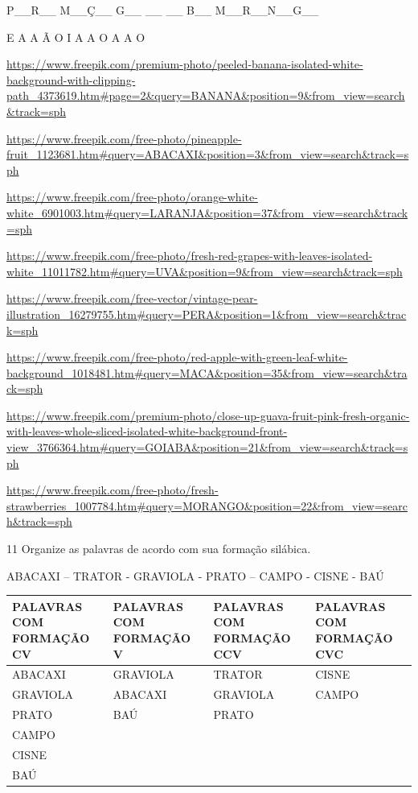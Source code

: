 {{P\_\_R\_\_ M\_\_Ç\_\_ G\_\_ \_\_ \_\_ B\_\_ M\_\_R\_\_N\_\_G\_\_

E A A Ã O I A A O A A O

\url{https://www.freepik.com/premium-photo/peeled-banana-isolated-white-background-with-clipping-path_4373619.htm\#page=2\&query=BANANA\&position=9\&from_view=search\&track=sph}

\url{https://www.freepik.com/free-photo/pineapple-fruit_1123681.htm\#query=ABACAXI\&position=3\&from_view=search\&track=sph}

\url{https://www.freepik.com/free-photo/orange-white-white_6901003.htm\#query=LARANJA\&position=37\&from_view=search\&track=sph}

\url{https://www.freepik.com/free-photo/fresh-red-grapes-with-leaves-isolated-white_11011782.htm\#query=UVA\&position=9\&from_view=search\&track=sph}

\url{https://www.freepik.com/free-vector/vintage-pear-illustration_16279755.htm\#query=PERA\&position=1\&from_view=search\&track=sph}

\url{https://www.freepik.com/free-photo/red-apple-with-green-leaf-white-background_1018481.htm\#query=MACA\&position=35\&from_view=search\&track=sph}

\url{https://www.freepik.com/premium-photo/close-up-guava-fruit-pink-fresh-organic-with-leaves-whole-sliced-isolated-white-background-front-view_3766364.htm\#query=GOIABA\&position=21\&from_view=search\&track=sph}

\url{https://www.freepik.com/free-photo/fresh-strawberries_1007784.htm\#query=MORANGO\&position=22\&from_view=search\&track=sph}

\num{11} Organize as palavras de acordo com sua formação silábica.


ABACAXI -- TRATOR - GRAVIOLA - PRATO -- CAMPO - CISNE - BAÚ

\begin{longtable}[]{@{}llll@{}}
\toprule
\textbf{PALAVRAS COM FORMAÇÃO CV} & \textbf{PALAVRAS COM FORMAÇÃO V} &
\textbf{PALAVRAS COM FORMAÇÃO CCV} & \textbf{PALAVRAS COM FORMAÇÃO
CVC}\tabularnewline
\midrule
\endhead
ABACAXI & GRAVIOLA & TRATOR & CISNE\tabularnewline
GRAVIOLA & ABACAXI & GRAVIOLA & CAMPO\tabularnewline
PRATO & BAÚ & PRATO &\tabularnewline
CAMPO & & &\tabularnewline
CISNE & & &\tabularnewline
BAÚ & & &\tabularnewline
\bottomrule
\end{longtable}

}}
